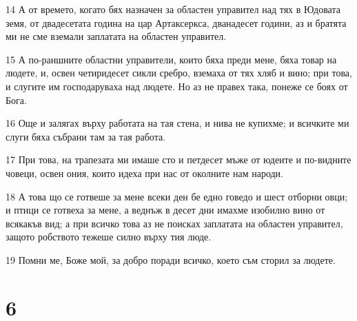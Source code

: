 \par 14 А от времето, когато бях назначен за областен управител над тях в Юдовата земя, от двадесетата година на цар Артаксеркса, дванадесет години, аз и братята ми не сме вземали заплатата на областен управител.
\par 15 А по-раншните областни управители, които бяха преди мене, бяха товар на людете, и, освен четиридесет сикли сребро, вземаха от тях хляб и вино; при това, и слугите им господаруваха над людете. Но аз не правех така, понеже се боях от Бога.
\par 16 Още и залягах върху работата на тая стена, и нива не купихме; и всичките ми слуги бяха събрани там за тая работа.
\par 17 При това, на трапезата ми имаше сто и петдесет мъже от юдеите и по-видните човеци, освен ония, които идеха при нас от околните нам народи.
\par 18 А това що се готвеше за мене всеки ден бе едно говедо и шест отборни овци; и птици се готвеха за мене, а веднъж в десет дни имахме изобилно вино от всякакъв вид; а при всичко това аз не поисках заплатата на областен управител, защото робството тежеше силно върху тия люде.
\par 19 Помни ме, Боже мой, за добро поради всичко, което съм сторил за людете.

\chapter{6}

